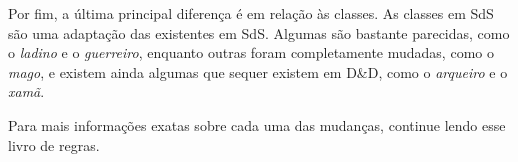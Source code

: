 Por fim, a última principal diferença é em relação às classes. As classes em SdS
são uma adaptação das existentes em SdS. Algumas são bastante parecidas, como o
\textit{ladino} e o \textit{guerreiro}, enquanto outras foram completamente
mudadas, como o \textit{mago}, e existem ainda algumas que sequer existem em
D\&D, como o \textit{arqueiro} e o \textit{xamã}.

Para mais informações exatas sobre cada uma das mudanças, continue lendo esse
livro de regras.

